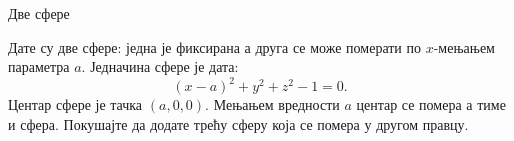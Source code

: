 ﻿\documentclass[en]{./../../common/SurferDesc}%
\begin{document}
\footnotesize
%
\begin{surferPage}
  \begin{surferTitle} Две сфере\end{surferTitle}
   \begin{surferText}   
   
Дате су две сфере: једна је фиксирана а друга се може померати по $x$-мењањем параметра $a$.
Једначина сфере је дата:
\[(x-a)^2+y^2+z^2-1=0.\]
Центар сфере је тачка $(a,0,0)$. Мењањем вредности $a$ центар се помера а тиме и сфера.
Покушајте да додате трећу сферу која се помера у другом правцу.
     \end{surferText}
\end{surferPage}
\end{document}
